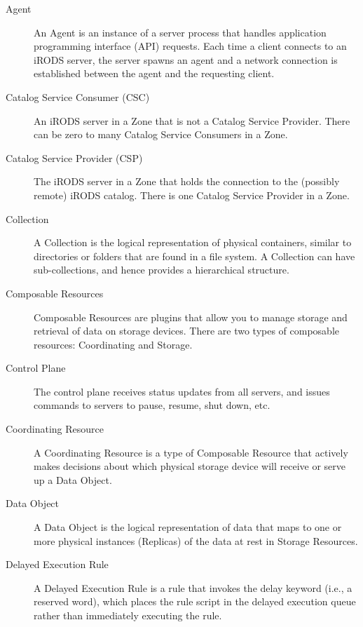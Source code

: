 \documentclass[10pt,oneside]{memoir}
\begin{document}
\begin{description}

\item [Agent]
An Agent is an instance of a server process that handles application programming interface (API) requests. Each time a client connects to an iRODS server, the server spawns an agent and a network connection is established between the agent and the requesting client.

\item [Catalog Service Consumer (CSC)]
An iRODS server in a Zone that is not a Catalog Service Provider. There can be zero to many Catalog Service Consumers in a Zone.

\item [Catalog Service Provider (CSP)]
The iRODS server in a Zone that holds the connection to the (possibly remote) iRODS catalog. There is one Catalog Service Provider in a Zone.

\item [Collection]
A Collection is the logical representation of physical containers, similar to directories or folders that are found in a file system. A Collection can have sub-collections, and hence provides a hierarchical structure.

\item [Composable Resources]
Composable Resources are plugins that allow you to manage storage and retrieval of data on storage devices. There are two types of composable resources: Coordinating and Storage.

\item [Control Plane]
The control plane receives status updates from all servers, and issues commands to servers to pause, resume, shut down, etc.

\item [Coordinating Resource]
A Coordinating Resource is a type of Composable Resource that actively makes decisions about which physical storage device will receive or serve up a Data Object.

\item [Data Object]
A Data Object is the logical representation of data that maps to one or more physical instances (Replicas) of the data at rest in Storage Resources.

\item [Delayed Execution Rule]
A Delayed Execution Rule is a rule that invokes the delay keyword (i.e., a reserved word), which places the rule script in the delayed execution queue rather than immediately executing the rule.


\end{description}
\end{document}
